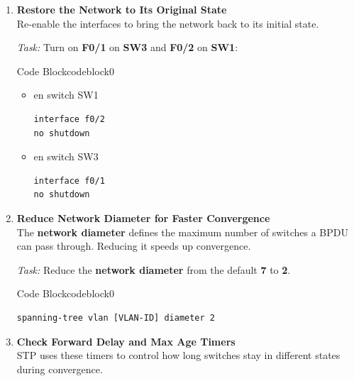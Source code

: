 \documentclass[a4paper]{book}
\begin{document}
\begin{enumerate}
	\item \textbf{Restore the Network to Its Original State} \\
	      Re-enable the interfaces to bring the network back to its initial state.

	      \textit{Task:}  Turn on \textbf{F0/1} on \textbf{SW3} and \textbf{F0/2} on \textbf{SW1}:



	      \begin{ocg}{Code Block}{codeblock}{0}
		      \vspace{0.5cm}
		      \begin{itemize}
			      \item en switch SW1
			            \begin{lstlisting}
interface f0/2
no shutdown
                \end{lstlisting}
			      \item en switch SW3
			            \begin{lstlisting}
interface f0/1
no shutdown
                \end{lstlisting}
		      \end{itemize}
	      \end{ocg}

	\item \textbf{Reduce Network Diameter for Faster Convergence} \\
	      The \textbf{network diameter} defines the maximum number of switches a BPDU can pass through. Reducing it speeds up convergence.

	      \textit{Task:} Reduce the \textbf{network diameter} from the default \textbf{7} to \textbf{2}.




	      \begin{ocg}{Code Block}{codeblock}{0}
		      \vspace{0.5cm}
		      \begin{lstlisting}
spanning-tree vlan [VLAN-ID] diameter 2
            \end{lstlisting}
	      \end{ocg}
	\item \textbf{Check Forward Delay and Max Age Timers} \\
	      STP uses these timers to control how long switches stay in different states during convergence.


\end{enumerate}
\end{document}
